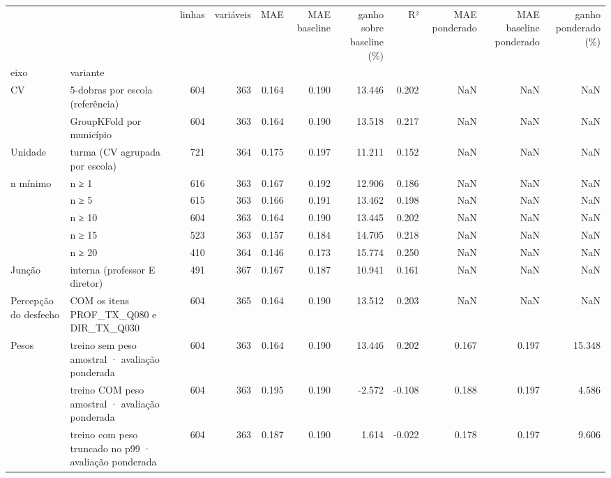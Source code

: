 \begin{tabular}{llrrrrrrrrr}
\toprule
 &  & linhas & variáveis & MAE & MAE baseline & ganho sobre baseline (\%) & R² & MAE ponderado & MAE baseline ponderado & ganho ponderado (\%) \\
eixo & variante &  &  &  &  &  &  &  &  &  \\
\midrule
\multirow[t]{2}{*}{CV} & 5-dobras por escola (referência) & 604 & 363 & 0.164 & 0.190 & 13.446 & 0.202 & NaN & NaN & NaN \\
 & GroupKFold por município & 604 & 363 & 0.164 & 0.190 & 13.518 & 0.217 & NaN & NaN & NaN \\
\cline{1-11}
Unidade & turma (CV agrupada por escola) & 721 & 364 & 0.175 & 0.197 & 11.211 & 0.152 & NaN & NaN & NaN \\
\cline{1-11}
\multirow[t]{5}{*}{n mínimo} & n ≥ 1 & 616 & 363 & 0.167 & 0.192 & 12.906 & 0.186 & NaN & NaN & NaN \\
 & n ≥ 5 & 615 & 363 & 0.166 & 0.191 & 13.462 & 0.198 & NaN & NaN & NaN \\
 & n ≥ 10 & 604 & 363 & 0.164 & 0.190 & 13.445 & 0.202 & NaN & NaN & NaN \\
 & n ≥ 15 & 523 & 363 & 0.157 & 0.184 & 14.705 & 0.218 & NaN & NaN & NaN \\
 & n ≥ 20 & 410 & 364 & 0.146 & 0.173 & 15.774 & 0.250 & NaN & NaN & NaN \\
\cline{1-11}
Junção & interna (professor E diretor) & 491 & 367 & 0.167 & 0.187 & 10.941 & 0.161 & NaN & NaN & NaN \\
\cline{1-11}
Percepção do desfecho & COM os itens PROF\_TX\_Q080 e DIR\_TX\_Q030 & 604 & 365 & 0.164 & 0.190 & 13.512 & 0.203 & NaN & NaN & NaN \\
\cline{1-11}
\multirow[t]{3}{*}{Pesos} & treino sem peso amostral · avaliação ponderada & 604 & 363 & 0.164 & 0.190 & 13.446 & 0.202 & 0.167 & 0.197 & 15.348 \\
 & treino COM peso amostral · avaliação ponderada & 604 & 363 & 0.195 & 0.190 & -2.572 & -0.108 & 0.188 & 0.197 & 4.586 \\
 & treino com peso truncado no p99 · avaliação ponderada & 604 & 363 & 0.187 & 0.190 & 1.614 & -0.022 & 0.178 & 0.197 & 9.606 \\
\cline{1-11}
\bottomrule
\end{tabular}
